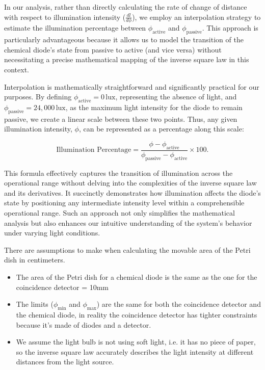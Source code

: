 \begin{tcolorbox}[colback=red!5!white,colframe=blue!75!black,title=Assumptions for mapping light intensity to radial distance,label={ass:assumptions-light-intensity}]
    In our analysis, rather than directly calculating the rate of change of distance with respect to illumination intensity (\(\frac{dl}{d\phi}\)), we employ an interpolation strategy to estimate the illumination percentage between \(\phi_{\text{active}}\) and \(\phi_{\text{passive}}\). This approach is particularly advantageous because it allows us to model the transition of the chemical diode's state from passive to active (and vice versa) without necessitating a precise mathematical mapping of the inverse square law in this context. 

    Interpolation is mathematically straightforward and significantly practical for our purposes. By defining \(\phi_{\text{active}} = 0\,\text{lux}\), representing the absence of light, and \(\phi_{\text{passive}} = 24,000\,\text{lux}\), as the maximum light intensity for the diode to remain passive, we create a linear scale between these two points. Thus, any given illumination intensity, \(\phi\), can be represented as a percentage along this scale:
    
    \[
    \text{Illumination Percentage} = \frac{\phi - \phi_{\text{active}}}{\phi_{\text{passive}} - \phi_{\text{active}}} \times 100.
    \]
    
    This formula effectively captures the transition of illumination across the operational range without delving into the complexities of the inverse square law and its derivatives. It succinctly demonstrates how illumination affects the diode's state by positioning any intermediate intensity level within a comprehensible operational range. Such an approach not only simplifies the mathematical analysis but also enhances our intuitive understanding of the system's behavior under varying light conditions.
\end{tcolorbox}
\begin{tcolorbox}[colback=red!5!white,colframe=blue!75!black,title=Assumptions for Light Intensity Calculation,label={ass:assumptions-light-intensity-calculation}]
    There are assumptions to make when calculating the movable area of the Petri dish in centimeters.
\begin{itemize}
    \item The area of the Petri dish for a chemical diode is the same as the one for the coincidence detector = 10mm
    \item The limits ($\phi_{\text{min}}$ and $\phi_{\text{max}}$) are the same for both the coincidence detector and the chemical diode, in reality the coincidence detector has tighter constraints because it's made of diodes and a detector.
    \item We assume the light bulb is not using soft light, i.e. it has no piece of paper, so the inverse square law accurately describes the light intensity at different distances from the light source. 
\end{itemize}
\end{tcolorbox}

